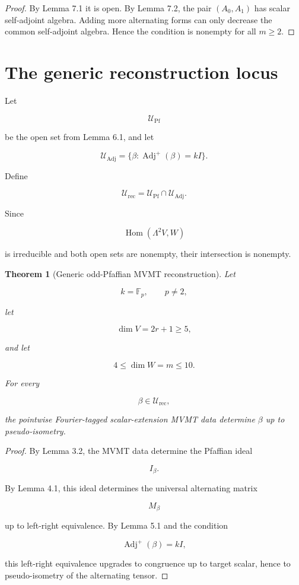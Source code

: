 \documentclass[11pt]{article}
\newtheorem{theorem}{Theorem}[section]
\begin{document}
\begin{proof}

By Lemma 7.1 it is open. By Lemma 7.2, the pair $(A_0,A_1)$ has scalar self-adjoint algebra. Adding more alternating forms can only decrease the common self-adjoint algebra. Hence the condition is nonempty for all $m\ge2$.

\end{proof}

\section{The generic reconstruction locus}

Let

\[
\mathcal U_{\mathrm{Pf}}
\]

be the open set from Lemma 6.1, and let

\[
\mathcal U_{\mathrm{Adj}}
=
\{\beta:\operatorname{Adj}^+(\beta)=kI\}.
\]

Define

\[
\mathcal U_{\mathrm{rec}}
=
\mathcal U_{\mathrm{Pf}}\cap \mathcal U_{\mathrm{Adj}}.
\]

Since

\[
\operatorname{Hom}(\Lambda^2V,W)
\]

is irreducible and both open sets are nonempty, their intersection is nonempty.

\begin{theorem}[Generic odd-Pfaffian MVMT reconstruction]

Let

\[
k=\mathbb F_p,\qquad p\neq2,
\]

let

\[
\dim V=2r+1\ge5,
\]

and let

\[
4\le \dim W=m\le10.
\]

For every

\[
\beta\in\mathcal U_{\mathrm{rec}},
\]

the pointwise Fourier-tagged scalar-extension MVMT data determine $\beta$ up to pseudo-isometry.

\end{theorem}

\begin{proof}

By Lemma 3.2, the MVMT data determine the Pfaffian ideal

\[
I_\beta.
\]

By Lemma 4.1, this ideal determines the universal alternating matrix

\[
M_\beta
\]

up to left-right equivalence. By Lemma 5.1 and the condition

\[
\operatorname{Adj}^+(\beta)=kI,
\]

this left-right equivalence upgrades to congruence up to target scalar, hence to pseudo-isometry of the alternating tensor.

\end{proof}
\end{document}
